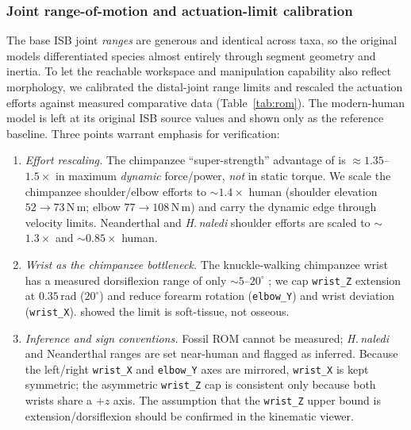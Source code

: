   \subsubsection{Joint range-of-motion and actuation-limit calibration}
  \label{sec:rom}
  The base ISB joint \emph{ranges} are generous and identical across taxa, so
  the original models differentiated species almost entirely through segment
  geometry and inertia. To let the reachable workspace and manipulation
  capability also reflect morphology, we calibrated the distal-joint range
  limits and rescaled the actuation efforts against measured comparative data
  (Table~\ref{tab:rom}). The modern-human model is left at its original ISB
  source values and shown only as the reference baseline. Three points warrant
  emphasis for verification:
  \begin{enumerate}
    \item \emph{Effort rescaling.} The chimpanzee ``super-strength'' advantage
    of \citet{oneill2017} is $\approx$$1.35$--$1.5\times$ in maximum
    \emph{dynamic} force/power, \emph{not} in static torque. We scale the
    chimpanzee shoulder/elbow efforts to $\sim$$1.4\times$ human (shoulder
    elevation $52{\to}73$\,N\,m; elbow $77{\to}108$\,N\,m) and carry the dynamic
    edge through velocity limits. Neanderthal and \textit{H.\,naledi} shoulder
    efforts are scaled to $\sim$$1.3\times$ and $\sim$$0.85\times$ human.
    \item \emph{Wrist as the chimpanzee bottleneck.} The knuckle-walking
    chimpanzee wrist has a measured dorsiflexion range of only
    $\sim$$5$--$20^\circ$ \citep{knuckle2020}; we cap \texttt{wrist\_Z}
    extension at $0.35$\,rad ($20^\circ$) and reduce forearm rotation
    (\texttt{elbow\_Y}) and wrist deviation (\texttt{wrist\_X}). \citet{straus1940} showed the limit is
    soft-tissue, not osseous.
    \item \emph{Inference and sign conventions.} Fossil ROM cannot be measured;
    \textit{H.\,naledi} and Neanderthal ranges are set near-human and flagged as
    inferred. Because the left/right \texttt{wrist\_X} and \texttt{elbow\_Y}
    axes are mirrored, \texttt{wrist\_X} is kept symmetric; the asymmetric
    \texttt{wrist\_Z} cap is consistent only because both wrists share a $+z$
    axis. The assumption that the \texttt{wrist\_Z} upper bound is
    extension/dorsiflexion should be confirmed in the kinematic viewer.
  \end{enumerate}

